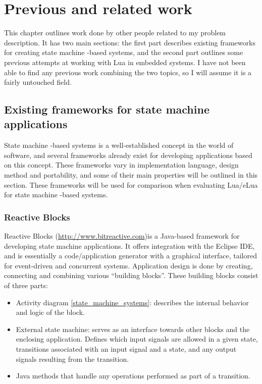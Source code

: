 \chapter{Previous and related work}
\label{ch:related_work}
This chapter outlines work done by other people related to my problem description. It has two main sections: the first part describes existing frameworks for creating state machine -based systems, and the second part outlines some previous attempts at working with Lua in embedded systems. I have not been able to find any previous work combining the two topics, so I will assume it is a fairly untouched field.

\section{Existing frameworks for state machine applications}
\label{sec:existing_frameworks_state_machine}
State machine -based systems is a well-established concept in the world of software, and several frameworks already exist for developing applications based on this concept. These frameworks vary in implementation language, design method and portability, and some of their main properties will be outlined in this section. These frameworks will be used for comparison when evaluating Lua/eLua for state machine -based systems.

\subsection{Reactive Blocks}
\label{sec:reactive_blocks}
Reactive Blocks (\url{http://www.bitreactive.com})is a Java-based framework for developing state machine applications. It offers integration with the Eclipse IDE, and is essentially a code/application generator with a graphical interface, tailored for event-driven and concurrent systems. Application design is done by creating, connecting and combining various “building blocks”. These building blocks consist of three parts:
\begin{itemize}
	\item Activity diagram \ref{state_machine_systems}: describes the internal behavior and logic of the block.
	\item External state machine: serves as an interface towards other blocks and the enclosing application. Defines which input signals are allowed in a given state, transitions associated with an input signal and a state, and any output signals resulting from the transition.
	\item Java methods that handle any operations performed as part of a transition.
\end{itemize}

